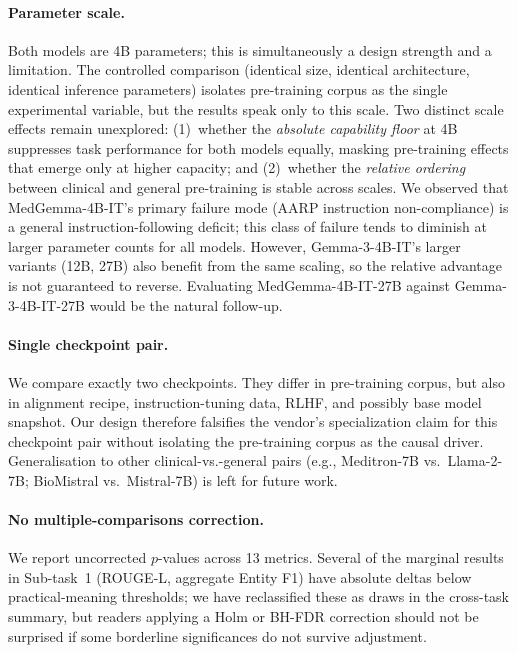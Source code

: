 \documentclass[sigconf,anonymous=false,review=false]{acmart}
\newcommand{\medgemma}{MedGemma-4B-IT\xspace}
\newcommand{\gemma}{Gemma-3-4B-IT\xspace}
\begin{document}
\paragraph{Parameter scale.}
Both models are 4B parameters; this is simultaneously a design strength and a
limitation. The controlled comparison (identical size, identical architecture,
identical inference parameters) isolates pre-training corpus as the single
experimental variable, but the results speak only to this scale. Two distinct
scale effects remain unexplored: (1)~whether the \emph{absolute capability
floor} at 4B suppresses task performance for both models equally, masking
pre-training effects that emerge only at higher capacity; and (2)~whether the
\emph{relative ordering} between clinical and general pre-training is stable
across scales. We observed that \medgemma's primary failure mode (AARP
instruction non-compliance) is a general instruction-following deficit; this
class of failure tends to diminish at larger parameter counts for all models.
However, \gemma's larger variants (12B, 27B) also benefit from the same
scaling, so the relative advantage is not guaranteed to reverse. Evaluating
\medgemma-27B against \gemma-27B would be the natural follow-up.

\paragraph{Single checkpoint pair.}
We compare exactly two checkpoints. They differ in pre-training corpus, but
also in alignment recipe, instruction-tuning data, RLHF, and possibly base
model snapshot. Our design therefore falsifies the vendor's specialization
claim for this checkpoint pair without isolating the pre-training corpus as
the causal driver. Generalisation to other clinical-vs.-general pairs
(e.g., Meditron-7B vs.\ Llama-2-7B; BioMistral vs.\ Mistral-7B) is left for
future work.

\paragraph{No multiple-comparisons correction.}
We report uncorrected $p$-values across 13 metrics. Several of the marginal
results in Sub-task~1 (ROUGE-L, aggregate Entity F1) have absolute deltas
below practical-meaning thresholds; we have reclassified these as draws in
the cross-task summary, but readers applying a Holm or BH-FDR correction
should not be surprised if some borderline significances do not survive
adjustment.
\end{document}
